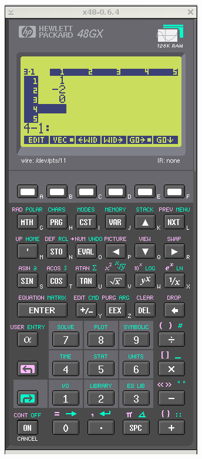 \documentclass[11pt]{article}
\begin{document}
\includegraphics[scale,height=0.33\textheight]{20180422143232-linear01-p3.png}
\bigskip
\end{document}
